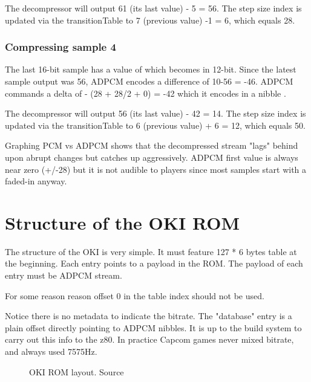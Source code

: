 The decompressor will output 61 (its last value) - 5 = 56. The step size index is updated via the transitionTable to 7 (previous value) -1 = 6, which equals 28.

\subsubsection{Compressing sample 4}
The last 16-bit sample has a value of  which becomes  in 12-bit. Since the latest sample output was 56, ADPCM encodes a difference of 10-56 = -46. ADPCM commands a delta of - (28 + 28/2 + 0) = -42 which it encodes in a nibble . 

The decompressor will output 56 (its last value) - 42 = 14. The step size index is updated via the transitionTable to 6 (previous value) + 6 = 12, which equals 50.

Graphing PCM vs ADPCM shows that the decompressed stream "lags" behind upon abrupt changes but catches up aggressively. ADPCM first value is always near zero (+/-28) but it is not audible to players since most samples start with a faded-in anyway. 


\section{Structure of the OKI ROM}
The structure of the OKI is very simple. It must feature 127 * 6 bytes table at the beginning. Each entry points to a payload in the ROM. The payload of each entry must be ADPCM stream.

For some reason reason offset 0 in the table index should not be used.



Notice there is no metadata to indicate the bitrate. The "database" entry is a plain offset directly pointing to ADPCM nibbles. It is up to the build system to carry out this info to the z80. In practice Capcom games never mixed bitrate, and always used 7575Hz.

\begin{figure}[H]
\caption*{OKI ROM layout. Source }
\end{figure}















